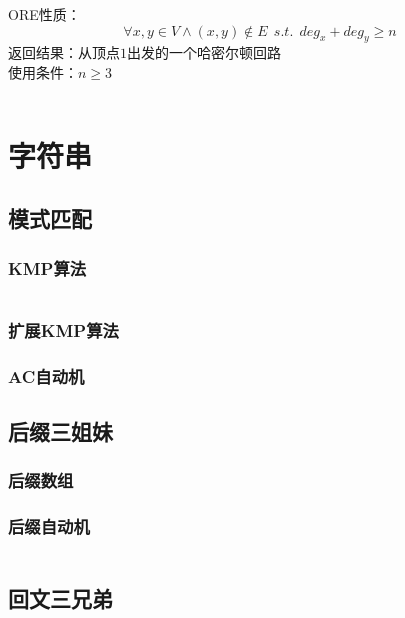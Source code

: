 \documentclass[a4paper]{article}
\newcommand{\cppcode}[1]{
    \inputminted[mathescape]{cpp}{source/#1}
}
\begin{document}
ORE性质：$$\forall x,y \in V \wedge (x,y) \notin E \ \ s.t. \ \ deg_x+deg_y \geq n$$
\indent 返回结果：从顶点$1$出发的一个哈密尔顿回路\\
\indent 使用条件：$n \geq 3$

\cppcode{graph-theory/hamiltonian-circuit-ore.cpp}

\section{字符串}

\subsection{模式匹配}

\subsubsection{KMP算法}

\cppcode{string-manipulation/knuth-morris-pratt.cpp}

\subsubsection{扩展KMP算法}

\subsubsection{AC自动机}


\subsection{后缀三姐妹}

\subsubsection{后缀数组}


\subsubsection{后缀自动机}

\cppcode{string-manipulation/suffix-automation.cpp}

\subsection{回文三兄弟}
\end{document}
